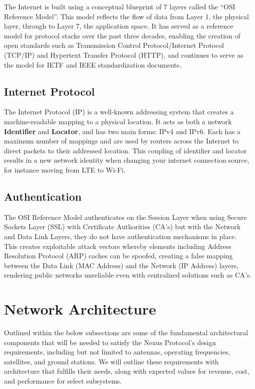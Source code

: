 \documentclass[11pt]{article}
\begin{document}
The Internet is built using a conceptual blueprint of 7 layers called the ``OSI Reference Model''.
This model reflects the flow of data from Layer 1, the physical layer, through to Layer 7, the application space. 
It has served as a reference model for protocol stacks over the past three decades, enabling the creation of open standards such as Transmission Control Protocol/Internet Protocol (TCP/IP) and Hypertext Transfer Protocol (HTTP), and continues to serve as the model for IETF and IEEE standardization documents.


\subsection{Internet Protocol}

The Internet Protocol (IP) is a well-known addressing system that creates a machine-readable mapping to a physical location.
It acts as both a network \textbf{Identifier} and \textbf{Locator}, and has two main forms: IPv4 and IPv6. 
Each has a maximum number of mappings and are used by routers across the Internet to direct packets to their addressed location.
This coupling of identifier and locator results in a new network identity when changing your internet connection source, for instance moving from LTE to Wi-Fi.


\subsection{Authentication}

The OSI Reference Model authenticates on the Session Layer when using Secure Sockets Layer (SSL) with Certificate Authorities (CA's) but with the Network and Data Link Layers, they do not have authentication mechanisms in place.
This creates exploitable attack vectors whereby elements including Address Resolution Protocol (ARP) caches can be spoofed, creating a false mapping between the Data Link (MAC Address) and the Network (IP Address) layers, rendering public networks unreliable even with centralized solutions such as CA's.



\section{Network Architecture}

Outlined within the below subsections are some of the fundamental architectural components that will be needed to satisfy the Nexus Protocol's design requirements, including but not limited to antennas, operating frequencies, satellites, and ground stations.
We will outline these requirements with architecture that fulfills their needs, along with expected values for revenue, cost, and performance for select subsystems.
\end{document}
